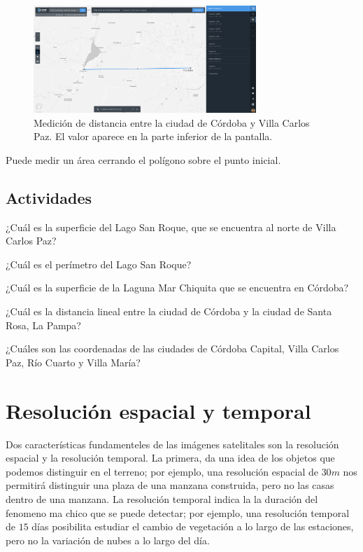\documentclass[a4paper,12pt]{book}
\begin{document}
\begin{figure}[!h]
    \centering
    \includegraphics[width=0.75\textwidth]{fig:distancia.png}
    \caption{Medición de distancia entre la ciudad de Córdoba y Villa Carlos Paz. El valor aparece en la parte inferior de la pantalla.}
    \label{fig:distancia}
\end{figure}

Puede medir un área cerrando el polígono sobre el punto inicial.

\section{Actividades}

\begin{que}
    ¿Cuál es la superficie del Lago San Roque, que se encuentra al norte de Villa Carlos Paz?
\end{que}
\begin{que}
    ¿Cuál es el perímetro del Lago San Roque?
\end{que}
\begin{que}
    ¿Cuál es la superficie de la Laguna Mar Chiquita que se encuentra en Córdoba?
\end{que}

\begin{que}
    ¿Cuál es la distancia lineal entre la ciudad de Córdoba y la ciudad de Santa Rosa, La Pampa?
\end{que}

\begin{que}
    ¿Cuáles son las coordenadas de las ciudades de Córdoba Capital, Villa Carlos Paz, Río Cuarto y Villa María?
\end{que}

\chapter{Resolución espacial y temporal}
Dos características fundamenteles de las imágenes satelitales son la resolución espacial y la resolución temporal. La primera, da una idea de los objetos que podemos distinguir en el terreno; por ejemplo, una resolución espacial de $30m$ nos permitirá distinguir una plaza de una manzana construida, pero no las casas dentro de una manzana. La resolución temporal indica la la duración del fenomeno ma chico que se puede detectar; por ejemplo, una resolución temporal de $15$ días posibilita estudiar el cambio de vegetación a lo largo de las estaciones, pero no la variación de nubes a lo largo del día.
\end{document}
